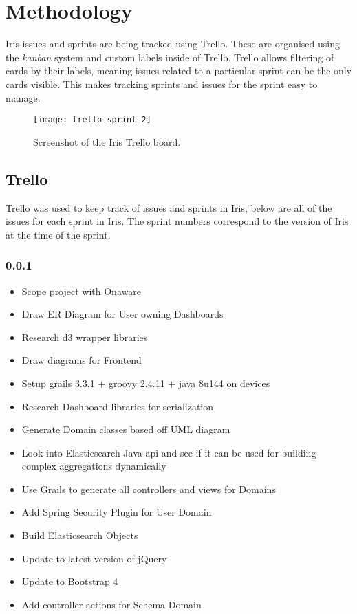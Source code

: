 \documentclass[12pt]{report}
\begin{document}
\chapter{Methodology}
Iris issues and sprints are being tracked using Trello. These are organised using the {\em kanban} system and custom labels inside of Trello. Trello allows filtering of cards by their labels, meaning issues related to a particular sprint can be the only cards visible. This makes tracking sprints and issues for the sprint easy to manage.

\begin{figure}[H]
\begin{tcolorbox}
\begin{center}
\texttt{[image: trello\_sprint\_2]}
\end{center}
\end{tcolorbox}
\caption{Screenshot of the Iris Trello board.}
\end{figure}

\section{Trello}
Trello was used to keep track of issues and sprints in Iris, below are all of the issues for each sprint in Iris. The sprint numbers correspond to the version of Iris at the time of the sprint.
\subsection*{0.0.1}
\begin{itemize}
\item Scope project with Onaware
\item Draw ER Diagram for User owning Dashboards
\item Research d3 wrapper libraries
\item Draw diagrams for Frontend
\item Setup grails 3.3.1 + groovy 2.4.11 + java 8u144 on devices
\item Research Dashboard libraries for serialization
\item Generate Domain classes based off UML diagram
\item Look into Elasticsearch Java api and see if it can be used for building complex aggregations dynamically
\item Use Grails to generate all controllers and views for Domains
\item Add Spring Security Plugin for User Domain
\item Build Elasticsearch Objects
\item Update to latest version of jQuery
\item Update to Bootstrap 4
\item Add controller actions for Schema Domain
\end{itemize}
\end{document}

